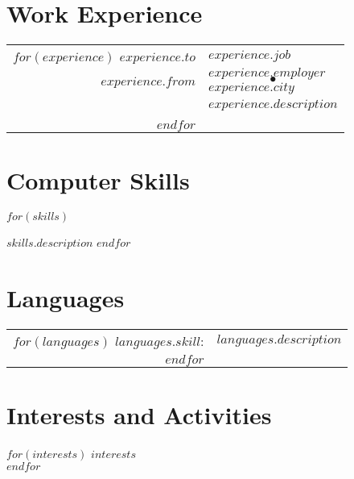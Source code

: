 \documentclass[a4paper,10pt]{article}
\begin{document}
\section{Work Experience}

\begin{tabular}{r|p{11cm}}
$for(experience)$
$experience.to$   & $experience.job$\\
$experience.from$ & \textsc{$experience.employer$}\textcolor{lightcomment}{$$~~\bullet~~$$}$experience.city$ \\
                  & \footnotesize{\textsf{$experience.description$}}\\
\multicolumn{2}{c}{} \\
$endfor$
\end{tabular}

\begin{multicols}{2}
\section{Computer Skills}
\begin{description}
$for(skills)$
\item[\textsc{$skills.skill$}]\footnotesize{\textsf{$skills.description$}}
$endfor$
\end{description}

\columnbreak

\section{Languages}

\begin{tabular}{rl}
$for(languages)$
\textsc{$languages.skill$:} & $languages.description$\\
$endfor$
\end{tabular}
\end{multicols}


\section{Interests and Activities}
$for(interests)$
$interests$\\
$endfor$
\end{document}
